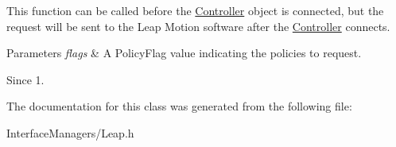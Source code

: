 This function can be called before the \hyperlink{class_leap_1_1_controller}{Controller} object is connected, but the request will be sent to the Leap Motion software after the \hyperlink{class_leap_1_1_controller}{Controller} connects.


\begin{DoxyParams}{Parameters}
{\em flags} & A Policy\+Flag value indicating the policies to request. \\
\hline
\end{DoxyParams}
\begin{DoxySince}{Since}
1. 
\end{DoxySince}


The documentation for this class was generated from the following file\+:\begin{DoxyCompactItemize}
\item 
Interface\+Managers/Leap.\+h\end{DoxyCompactItemize}
